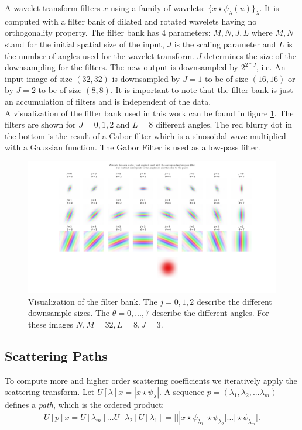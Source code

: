 A wavelet transform filters $x$ using a family of wavelets: $\{x \star \psi_\lambda (u)\}_\lambda$. It is computed with a filter bank of dilated and rotated wavelets having no orthogonality property. The filter bank has 4 parameters: $M, N, J, L$ where $M,N$ stand for the initial spatial size of the input, $J$ is the scaling parameter and $L$ is the number of angles used for the wavelet transform. $J$ determines the size of the downsampling for the filters. The new output is downsampled by $2^{2*J}$, i.e. An input image of size $(32, 32)$ is downsampled by $J=1$ to be of size $(16,16)$ or by $J=2$ to be of size $(8,8)$. It is important to note that the filter bank is just an accumulation of filters and is independent of the data. \\
A visualization of the filter bank used in this work can be found in figure \ref{fig:viz_filter_bank}. The filters are shown for $J=0,1,2$ and $L=8$ different angles. The red blurry dot in the bottom is the result of a Gabor filter which is a sinosoidal wave multiplied with a Gaussian function. The Gabor Filter is used as a low-pass filter.


\begin{figure}[!htb]
	\centering
	\includegraphics[width=\textwidth]{images/filter_bank_vis.png}
	\caption{Visualization of the filter bank. The $j=0,1,2$ describe the different downsample sizes. The $\theta=0,...,7$ describe the different angles. For these images $N,M=32, L=8, J=3$.}
    \label{fig:viz_filter_bank}
\end{figure}


\subsection{Scattering Paths}
\label{subsec:scattering_path}

To compute more and higher order scattering coefficients we iteratively apply the scattering transform. Let $U[\lambda]x = |x \star \psi_\lambda|$. A sequence $p = (\lambda_1, \lambda_2, ... \lambda_m)$ defines a \textit{path}, which is the ordered product: 
$$U[p]x = U[\lambda_m]...U[\lambda_2]U[\lambda_1] = | ||x \star \psi_{\lambda_1} | \star \psi_{\lambda_2}| ... | \star \psi_{\lambda_m}|. $$

